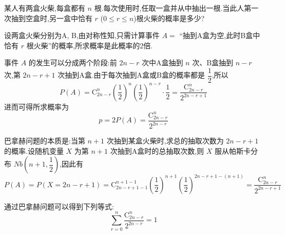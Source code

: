 \question[巴拿赫问题] 某人有两盒火柴,每盒都有 $n$ 根.每次使用时,任取一盒并从中抽出一根.当此人第一次抽到空盒时,另一盒中恰有 $r$ ($0 \leqslant r \leqslant n$)根火柴的概率是多少?

\begin{solution}
    设两盒火柴分别为A, B,由对称性知,只需计算事件 $A=$ ``抽到A盒为空,此时B盒中恰有 $r$ 根火柴''的概率,所求概率是此概率的2倍.

    事件 $A$ 的发生可以分成两个阶段:前 $2n-r$ 次中A盒抽到 $n$ 次、B盒抽到 $n-r$ 次,第 $2n-r+1$ 次抽到A盒.由于每次抽到A盒或B盒的概率都是 $\dfrac{1}{2}$,所以
    $$
    P(A) = \mathrm{C}_{2n-r}^n \left( \dfrac{1}{2} \right)^n \left( \dfrac{1}{2} \right)^{n-r} \cdot \dfrac{1}{2} = \dfrac{\mathrm{C}_{2n-r}^n}{2^{2n-r+1}}
    $$
    进而可得所求概率为
    $$
    p = 2P(A) = \dfrac{\mathrm{C}_{2n-r}^n}{2^{2n-r}}
    $$
\end{solution}

\begin{note}
    \indent 巴拿赫问题的本质是:当第 $n+1$ 次抽到某盒火柴时,求总的抽取次数为 $2n-r+1$ 的概率.设随机变量 $X$ 为第 $n+1$ 次抽到A盒时的总抽取次数,则 $X$ 服从帕斯卡分布 $Nb(n+1, \dfrac{1}{2})$,因此有
    $$
    P(A) = P(X = 2n-r+1) = \mathrm{C}_{2n-r+1-1}^{n+1-1} \left( \dfrac{1}{2} \right)^{n+1} \left( \dfrac{1}{2} \right)^{2n-r+1-(n+1)} = \dfrac{\mathrm{C}_{2n-r}^n}{2^{2n-r+1}}
    $$

    通过巴拿赫问题可以得到下列等式:
    $$
    \sum_{r=0}^n \dfrac{\mathrm{C}_{2n-r}^n}{2^{2n-r}} = 1
    $$
\end{note}